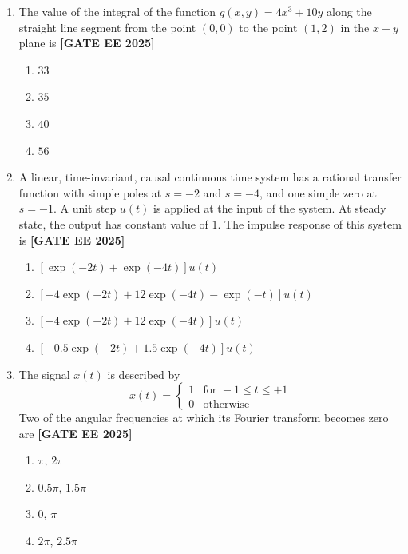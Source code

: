 \documentclass[12pt,a4paper]{article}
\begin{document}
\begin{enumerate}[leftmargin=*, label=\textbf{Q.\arabic*:}]
\item The value of the integral of the function $g(x, y) = 4x^3 + 10y$ along the straight line segment from the point $(0,0)$ to the point $(1,2)$ in the $x-y$ plane is
\newline
\noindent \textbf{[GATE EE 2025]}
\begin{enumerate}[label=(\Alph*)]
    \item $33$
    \item $35$
    \item $40$
    \item $56$
\end{enumerate}

\item A linear, time-invariant, causal continuous time system has a rational transfer function with simple poles at $s=-2$ and $s= -4$, and one simple zero at $s=-1$. A unit step $u(t)$ is applied at the input of the system. At steady state, the output has constant value of $1$. The impulse response of this system is
\newline
\noindent \textbf{[GATE EE 2025]}
\begin{enumerate}[label=(\Alph*)]
    \item $\left[\exp(-2t)+\exp(-4t) \right]u(t)$
    \item $\left[ -4\exp(-2t) + 12\exp(-4t) -\exp(-t) \right]u(t)$
    \item $\left[ -4\exp(-2t) + 12\exp(-4t) \right]u(t)$
    \item $\left[ -0.5\exp(-2t) + 1.5\exp(-4t) \right]u(t)$
\end{enumerate}

\item The signal $x(t)$ is described by
\[
x(t) = \begin{cases}
1 & \text{for } -1 \leq t \leq +1 \\
0 & \text{otherwise}
\end{cases}
\]
Two of the angular frequencies at which its Fourier transform becomes zero are
\newline
\noindent \textbf{[GATE EE 2025]}
\begin{enumerate}[label=(\Alph*)]
    \item $\pi,\,2\pi$
    \item $0.5\pi,\,1.5\pi$
    \item $0,\,\pi$
    \item $2\pi,\,2.5\pi$
\end{enumerate}


\end{enumerate}
\end{document}
